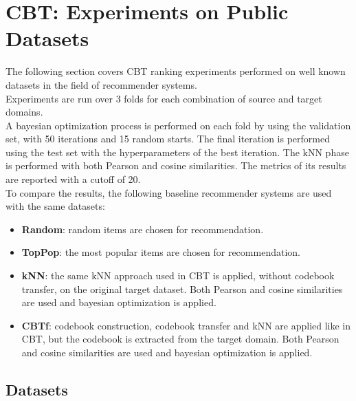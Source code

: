 \clearpage



\section{CBT: Experiments on Public Datasets}

The following section covers CBT ranking experiments performed on well known datasets in the field of recommender systems.\\
Experiments are run over 3 folds for each combination of source and target domains.\\
A bayesian optimization process is performed on each fold by using the validation set, with 50 iterations and 15 random starts. The final iteration is performed using the test set with the hyperparameters of the best iteration. The kNN phase is performed with both Pearson and cosine similarities. The metrics of its results are reported with a cutoff of 20.\\
To compare the results, the following baseline recommender systems are used with the same datasets:
\begin{itemize}
\item \textbf{Random}: random items are chosen for recommendation.
\item \textbf{TopPop}: the most popular items are chosen for recommendation.
\item \textbf{kNN}: the same kNN approach used in CBT is applied, without codebook transfer, on the original target dataset. Both Pearson and cosine similarities are used and bayesian optimization is applied.
\item \textbf{CBTf}: codebook construction, codebook transfer and kNN are applied like in CBT, but the codebook is extracted from the target domain. Both Pearson and cosine similarities are used and bayesian optimization is applied.
\end{itemize}


\subsection{Datasets}

